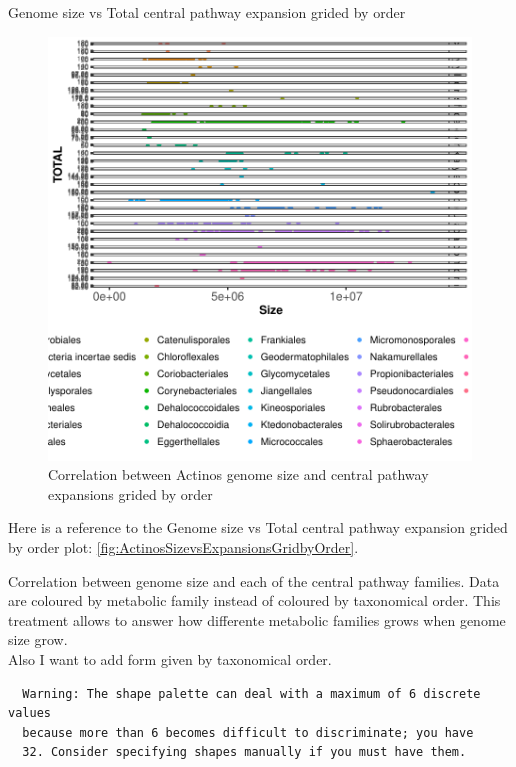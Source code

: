 \documentclass[12pt,twoside]{reedthesis}
\begin{document}
  Genome size vs Total central pathway expansion grided by order
  
  \begin{figure}[h!tbp]
  \centering
  \includegraphics[angle = 0,scale = 1]{chapter4/ActinosSizevsExpansionsGridbyOrder.pdf}
  \caption[Correlation between Actinos genome size and central pathway expansions grided by order]{\normalsize{Correlation between Actinos genome size and central pathway expansions grided by order}}
  \label{fig:ActinosSizevsExpansionsGridbyOrder}
  \end{figure}
  
  Here is a reference to the Genome size vs Total central pathway
  expansion grided by order plot:
  \autoref{fig:ActinosSizevsExpansionsGridbyOrder}. \clearpage 
  
  Correlation between genome size and each of the central pathway
  families. Data are coloured by metabolic family instead of coloured by
  taxonomical order. This treatment allows to answer how differente
  metabolic families grows when genome size grow.\\
  Also I want to add form given by taxonomical order.
  
  \begin{verbatim}
  Warning: The shape palette can deal with a maximum of 6 discrete values
  because more than 6 becomes difficult to discriminate; you have
  32. Consider specifying shapes manually if you must have them.
  \end{verbatim}
  
\end{document}
